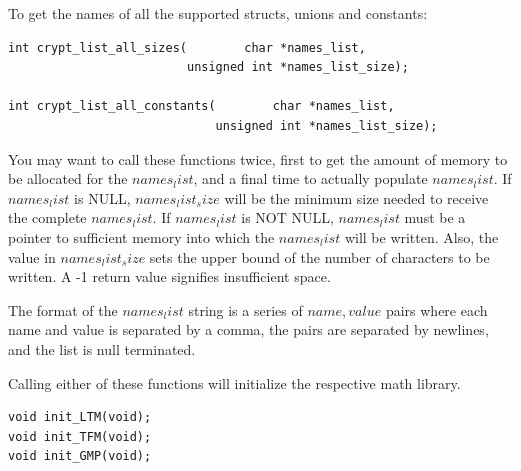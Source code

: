 \documentclass[synpaper]{book}
\begin{document}
To get the names of all the supported structs, unions and constants:
\begin{verbatim}
int crypt_list_all_sizes(        char *names_list,
                         unsigned int *names_list_size);

int crypt_list_all_constants(        char *names_list,
                             unsigned int *names_list_size);
\end{verbatim}
You may want to call these functions twice, first to get the amount
of memory to be allocated for the $names_list$, and a final time to
actually populate $names_list$.  If $names_list$ is NULL,
$names_list_size$ will be the minimum size needed to receive the
complete $names_list$.  If $names_list$ is NOT NULL, $names_list$ must
be a pointer to sufficient memory into which the $names_list$ will be
written.  Also, the value in $names_list_size$ sets the upper bound of
the number of characters to be written.  A -1 return value signifies
insufficient space.

The format of the $names_list$ string is a series of $name,value$ pairs
where each name and value is separated by a comma, the pairs are separated
by newlines, and the list is null terminated.

Calling either of these functions will initialize the respective
math library.
\begin{verbatim}
void init_LTM(void);
void init_TFM(void);
void init_GMP(void);
\end{verbatim}
\end{document}
